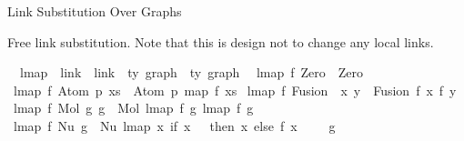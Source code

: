 \begin{isabellebody}
\endisatagproof
{\isafoldproof}%
%
\isadelimproof
%
\endisadelimproof
%
\isadelimdocument
%
\endisadelimdocument
%
\isatagdocument
%
\isamarkuptrue%
%
\endisatagdocument
{\isafolddocument}%
%
\isadelimdocument
%
\endisadelimdocument
%
\begin{isamarkuptext}%
Link Substitution Over Graphs%
\end{isamarkuptext}\isamarkuptrue%
%
\begin{isamarkuptext}%
Free link substitution.
Note that this is design not to change any local links.%
\end{isamarkuptext}\isamarkuptrue%
\isamarkupfalse%
\isanewline
\ \ lmap\ {\isacharcolon}{\kern0pt}{\isacharcolon}{\kern0pt}\ {\isachardoublequoteopen}{\isacharparenleft}{\kern0pt}link\ {\isacharequal}{\kern0pt}{\isachargreater}{\kern0pt}\ link{\isacharparenright}{\kern0pt}\ {\isacharequal}{\kern0pt}{\isachargreater}{\kern0pt}\ {\isacharprime}{\kern0pt}ty\ graph\ {\isacharequal}{\kern0pt}{\isachargreater}{\kern0pt}\ {\isacharprime}{\kern0pt}ty\ graph{\isachardoublequoteclose}\isanewline
{}\isanewline
\ \ {\isachardoublequoteopen}lmap\ f\ Zero\ {\isacharequal}{\kern0pt}\ Zero{\isachardoublequoteclose}\isanewline
{\isacharbar}{\kern0pt}\ {\isachardoublequoteopen}lmap\ f\ {\isacharparenleft}{\kern0pt}Atom\ p\ xs{\isacharparenright}{\kern0pt}\ {\isacharequal}{\kern0pt}\ Atom\ p\ {\isacharparenleft}{\kern0pt}map\ f\ xs{\isacharparenright}{\kern0pt}{\isachardoublequoteclose}\isanewline
{\isacharbar}{\kern0pt}\ {\isachardoublequoteopen}lmap\ f\ {\isacharparenleft}{\kern0pt}Fusion\ \ x\ y{\isacharparenright}{\kern0pt}\ {\isacharequal}{\kern0pt}\ Fusion\ {\isacharparenleft}{\kern0pt}f\ x{\isacharparenright}{\kern0pt}\ {\isacharparenleft}{\kern0pt}f\ y{\isacharparenright}{\kern0pt}{\isachardoublequoteclose}\isanewline
{\isacharbar}{\kern0pt}\ {\isachardoublequoteopen}lmap\ f\ {\isacharparenleft}{\kern0pt}Mol\ g{}\ g{}{\isacharparenright}{\kern0pt}\ {\isacharequal}{\kern0pt}\ Mol\ {\isacharparenleft}{\kern0pt}lmap\ f\ g{}{\isacharparenright}{\kern0pt}\ {\isacharparenleft}{\kern0pt}lmap\ f\ g{}{\isacharparenright}{\kern0pt}{\isachardoublequoteclose}\isanewline
{\isacharbar}{\kern0pt}\ {\isachardoublequoteopen}lmap\ f\ {\isacharparenleft}{\kern0pt}Nu\ g{\isacharparenright}{\kern0pt}\ {\isacharequal}{\kern0pt}\ Nu\ {\isacharparenleft}{\kern0pt}lmap\ {\isacharparenleft}{\kern0pt}{\isasymlambda}x{\isachardot}{\kern0pt}\ if\ x\ {\isacharequal}{\kern0pt}\ {}\ then\ x\ else\ {\isacharparenleft}{\kern0pt}f\ {\isacharparenleft}{\kern0pt}x\ {\isacharminus}{\kern0pt}\ {}{\isacharparenright}{\kern0pt}\ {\isacharplus}{\kern0pt}\ {}{\isacharparenright}{\kern0pt}{\isacharparenright}{\kern0pt}\ g{\isacharparenright}{\kern0pt}{\isachardoublequoteclose}\isanewline

\end{isabellebody}
